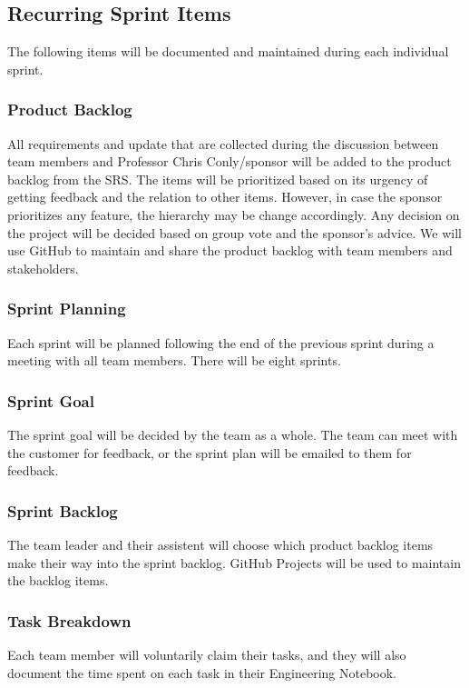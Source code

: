 \subsection{Recurring Sprint Items}
The following items will be documented and maintained during each individual sprint.

\subsubsection{Product Backlog}
All requirements and update that are collected during the discussion between team members and Professor Chris Conly/sponsor will be added to the product backlog from the SRS. The items will be prioritized based on its urgency of getting feedback and the relation to other items. However, in case the sponsor prioritizes any feature, the hierarchy may be change accordingly. Any decision on the project will be decided based on group vote and the sponsor's advice. We will use GitHub to maintain and share the product backlog with team members and stakeholders.

\subsubsection{Sprint Planning}
Each sprint will be planned following the end of the previous sprint during a meeting with all team members. There will be eight sprints.

\subsubsection{Sprint Goal}
The sprint goal will be decided by the team as a whole. The team can meet with the customer for feedback, or the sprint plan will be emailed to them for feedback.

\subsubsection{Sprint Backlog}
The team leader and their assistent will choose which product backlog items make their way into the sprint backlog. GitHub Projects will be used to maintain the backlog items.

\subsubsection{Task Breakdown}
Each team member will voluntarily claim their tasks, and they will also document the time spent on each task in their Engineering Notebook.


